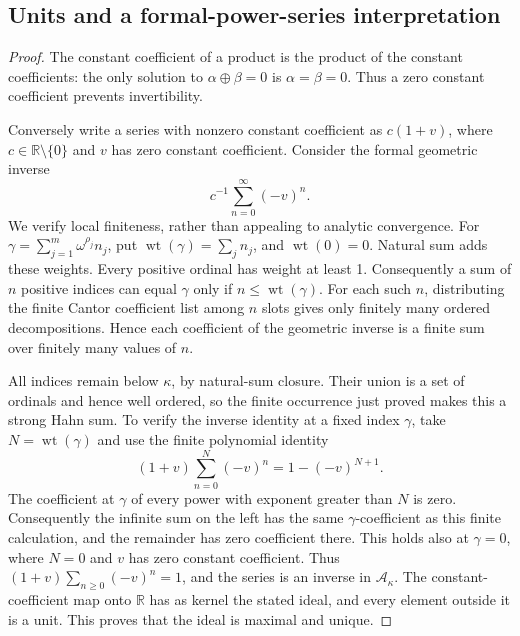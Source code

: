 \documentclass[11pt,letterpaper]{article}
\newtheorem{proposition}[theorem]{Proposition}
\theoremstyle{definition}
\theoremstyle{remark}
\newcommand{\R}{\mathbb{R}}
\newcommand{\A}{\mathscr{A}}
\newcommand{\ns}{\mathbin{\oplus}}
\DeclareMathOperator{\wt}{wt}
\begin{document}
\subsection{Units and a formal-power-series interpretation}
\begin{proof}
The constant coefficient of a product is the product of the constant
coefficients: the only solution to \(\alpha\ns\beta=0\) is
\(\alpha=\beta=0\). Thus a zero constant coefficient prevents
invertibility.

Conversely write a series with nonzero constant coefficient as
\(c(1+v)\), where \(c\in\R\setminus\{0\}\) and \(v\) has zero
constant coefficient. Consider the formal geometric inverse
\[
 c^{-1}\sum_{n=0}^{\infty}(-v)^n.
\]
We verify local finiteness, rather than appealing to analytic convergence.
For \(\gamma=\sum_{j=1}^m\omega^{\rho_j}n_j\), put
\(\wt(\gamma)=\sum_j n_j\), and \(\wt(0)=0\). Natural sum adds
these weights. Every positive ordinal has weight at least 1. Consequently
a sum of \(n\) positive indices can equal \(\gamma\) only if
\(n\leq\wt(\gamma)\). For each such \(n\), distributing the finite
Cantor coefficient list among \(n\) slots gives only finitely many
ordered decompositions. Hence each coefficient of the geometric inverse
is a finite sum over finitely many values of \(n\).

All indices remain below \(\kappa\), by natural-sum closure.
Their union is a set of ordinals and hence well ordered, so the finite
occurrence just proved makes this a strong Hahn sum. To verify the
inverse identity at a fixed index \(\gamma\), take \(N=\wt(\gamma)\)
and use the finite polynomial identity
\[
 (1+v)\sum_{n=0}^{N}(-v)^n=1-(-v)^{N+1}.
\]
The coefficient at \(\gamma\) of every power with exponent greater
than \(N\) is zero. Consequently the infinite sum on the left has the
same \(\gamma\)-coefficient as this finite calculation, and the
remainder has zero coefficient there. This holds also at \(\gamma=0\),
where \(N=0\) and \(v\) has zero constant coefficient. Thus
\((1+v)\sum_{n\geq0}(-v)^n=1\), and the series is an inverse in
\(\A_\kappa\). The constant-coefficient map onto \(\R\) has as kernel
the stated ideal, and every element outside it is a unit. This proves
that the ideal is maximal and unique.
\end{proof}
\end{document}
